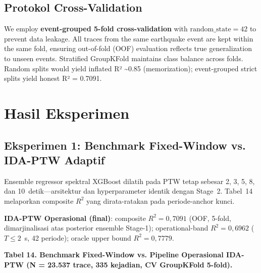 \documentclass[10pt]{article}
\begin{document}
\subsection{Protokol Cross-Validation}

We employ \textbf{event-grouped 5-fold cross-validation} with $\mathrm{random\_state} = 42$ to prevent data leakage. All traces from the same earthquake event are kept within the same fold, ensuring out-of-fold (OOF) evaluation reflects true generalization to unseen events. Stratified GroupKFold maintains class balance across folds. Random splits would yield inflated R² \textasciitilde0.85 (memorization); event-grouped strict splits yield honest R² = 0.7091.

\section{Hasil Eksperimen}

\subsection{Eksperimen 1: Benchmark Fixed-Window vs. IDA-PTW Adaptif}

Ensemble regressor spektral XGBoost dilatih pada PTW tetap sebesar 2, 3, 5, 8, dan 10~detik---arsitektur dan hyperparameter identik dengan Stage~2. Tabel~14 melaporkan composite \(R^2\) yang dirata-ratakan pada periode-anchor kunci.

\textbf{IDA-PTW Operasional (final)}: composite \(R^2 = 0,7091\) (OOF, 5-fold, dimarjinalisasi atas posterior ensemble Stage-1); operational-band \(R^2 = 0,6962\) (\(T \leq 2\)~s, 42 periode); oracle upper bound \(R^2 = 0,7779\).

\par\vspace{16pt}\noindent\begingroup\centering\fontsize{8}{10}\selectfont\textbf{Tabel 14. Benchmark Fixed-Window vs. Pipeline Operasional IDA-PTW (N = 23.537 trace, 335 kejadian, CV GroupKFold 5-fold).}\par\endgroup\vspace{6pt}
\end{document}
